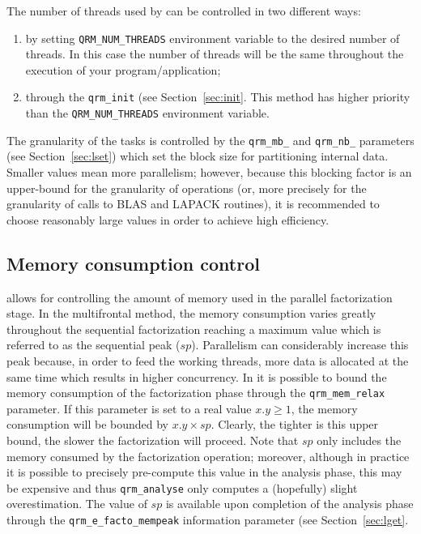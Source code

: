 \documentclass[11pt]{article}
\begin{document}
The number of threads used by \qrm can be controlled in two different
ways:
\begin{enumerate}
\item by setting \texttt{QRM\_NUM\_THREADS} environment variable to the desired
  number of threads. In this case the number of threads will be the
  same throughout the execution of your program/application;
\item through the \texttt{qrm\_init} (see
  Section~\ref{sec:init}. This method has higher priority than the
\texttt{QRM\_NUM\_THREADS} environment variable. 
\end{enumerate}

The granularity of the tasks is controlled by the \texttt{qrm\_mb\_}
and  \texttt{qrm\_nb\_}
parameters (see Section~\ref{sec:lset}) which set the block size for
partitioning internal data. Smaller values mean more parallelism;
however, because this blocking factor is an upper-bound for the
granularity of operations (or, more precisely for the granularity of
calls to BLAS and LAPACK routines), it is recommended to choose
reasonably large values in order to achieve high efficiency. 

\subsection{Memory consumption control}
\label{sec:ma}
\qrm allows for controlling the amount of memory used in the parallel
factorization stage. In the multifrontal method, the memory
consumption varies greatly throughout the sequential factorization
reaching a maximum value which is referred to as the sequential peak
($sp$). Parallelism can considerably increase this peak because, in
order to feed the working threads, more data is allocated at the same
time which results in higher concurrency. In \qrm it is possible to
bound the memory consumption of the factorization phase through the
\texttt{qrm\_mem\_relax} parameter. If this parameter is set to a real
value $x.y \ge 1$, the memory consumption will be bounded by
$x.y \times sp$. Clearly, the tighter is this upper bound, the slower
the factorization will proceed. Note that $sp$ only includes the
memory consumed by the factorization operation; moreover, although in
practice it is possible to precisely pre-compute this value in the
analysis phase, this may be expensive and thus \texttt{qrm\_analyse}
only computes a (hopefully) slight overestimation. The value of $sp$
is available upon completion of the analysis phase through the
\texttt{qrm\_e\_facto\_mempeak} information parameter (see
Section~\ref{sec:lget}.
\end{document}
